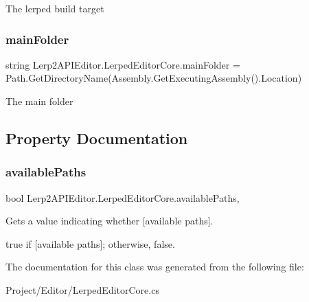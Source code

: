 The lerped build target 

\mbox{\label{class_lerp2_a_p_i_editor_1_1_lerped_editor_core_aae797b81cb9e4bc1f42b9046f1e1759c}} 
\subsubsection{\texorpdfstring{main\+Folder}{mainFolder}}
{\footnotesize\ttfamily string Lerp2\+A\+P\+I\+Editor.\+Lerped\+Editor\+Core.\+main\+Folder = Path.\+Get\+Directory\+Name(Assembly.\+Get\+Executing\+Assembly().Location)\hspace{0.3cm}{\ttfamily [static]}}



The main folder 



\subsection{Property Documentation}
\mbox{\label{class_lerp2_a_p_i_editor_1_1_lerped_editor_core_ae8f930032b75fb5aeaa237bb45f8ae86}} 
\subsubsection{\texorpdfstring{available\+Paths}{availablePaths}}
{\footnotesize\ttfamily bool Lerp2\+A\+P\+I\+Editor.\+Lerped\+Editor\+Core.\+available\+Paths\hspace{0.3cm}{\ttfamily [static]}, {\ttfamily [get]}}



Gets a value indicating whether \mbox{[}available paths\mbox{]}. 

{\ttfamily true} if \mbox{[}available paths\mbox{]}; otherwise, {\ttfamily false}.

The documentation for this class was generated from the following file\+:\begin{DoxyCompactItemize}
\item 
Project/\+Editor/Lerped\+Editor\+Core.\+cs\end{DoxyCompactItemize}
